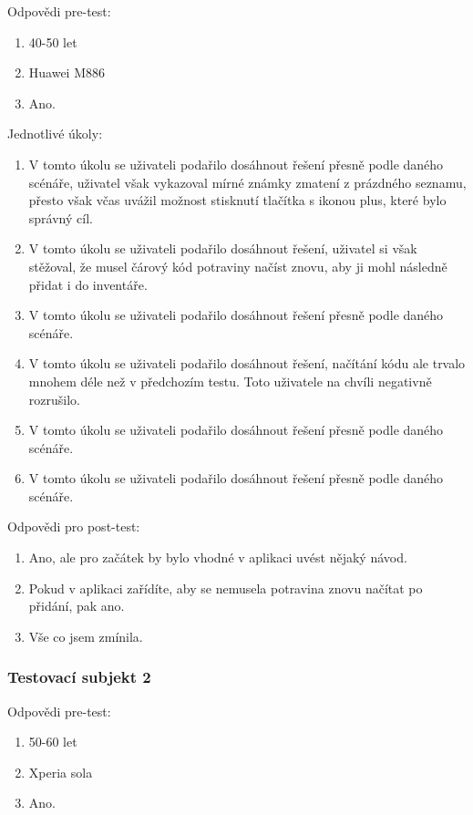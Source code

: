 \documentclass[thesis=B,czech]{FITthesis}[2013/10/20]
\begin{document}
Odpovědi pre-test:

\begin{enumerate}
  \item 40-50 let
  \item Huawei M886
  \item Ano.
\end{enumerate}

Jednotlivé úkoly:
\begin{enumerate}
  \item V tomto úkolu se uživateli podařilo dosáhnout řešení přesně podle daného scénáře, uživatel však vykazoval mírné známky zmatení z prázdného seznamu, přesto však včas uvážil možnost stisknutí tlačítka s ikonou plus, které bylo správný cíl.
  \item V tomto úkolu se uživateli podařilo dosáhnout řešení, uživatel si však stěžoval, že musel čárový kód potraviny načíst znovu, aby ji mohl následně přidat i do inventáře.
  \item V tomto úkolu se uživateli podařilo dosáhnout řešení přesně podle daného scénáře.
  \item V tomto úkolu se uživateli podařilo dosáhnout řešení, načítání kódu ale trvalo mnohem déle než v předchozím testu. Toto uživatele na chvíli negativně rozrušilo.
  \item V tomto úkolu se uživateli podařilo dosáhnout řešení přesně podle daného scénáře.
  \item V tomto úkolu se uživateli podařilo dosáhnout řešení přesně podle daného scénáře.
\end{enumerate}

Odpovědi pro post-test:
\begin{enumerate}
  \item Ano, ale pro začátek by bylo vhodné v aplikaci uvést nějaký návod.
  \item Pokud v aplikaci zařídíte, aby se nemusela potravina znovu načítat po přidání, pak ano.
  \item Vše co jsem zmínila.
\end{enumerate}

\subsubsection{Testovací subjekt 2}

Odpovědi pre-test:

\begin{enumerate}
  \item 50-60 let
  \item Xperia sola
  \item Ano.
\end{enumerate}
\end{document}
